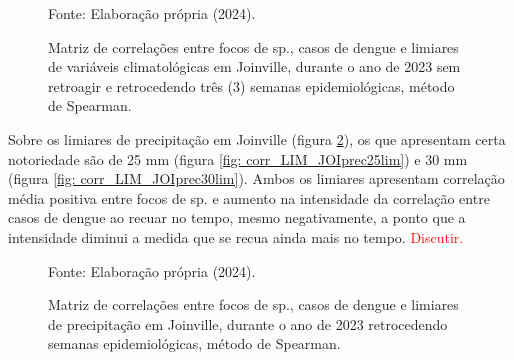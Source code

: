 \documentclass[
	12pt,				%
	openright,			%
	oneside,			%
	a4paper,			%
	english,			%
	french,				%
	spanish,			%
	brazil				%
	dvipsnames, table]{abntex2}
\begin{document}
\begin{figure}[htbp]
    \begin{center}
    \caption{Matriz de correlações entre focos de  sp., casos de dengue e limiares de variáveis climatológicas em Joinville, durante o ano de 2023 sem retroagir e retrocedendo três (3) semanas epidemiológicas, método de Spearman.}
    \label{fig: matriz_corr_LIM_JOIretro}
        \hfill
    \end{center}
    \small{Fonte: Elaboração própria (2024).}
\end{figure}

\indent Sobre os limiares de precipitação em Joinville (figura \ref{fig: matriz_corr_LIM_JOIprec}), os que apresentam certa notoriedade são de 25 mm (figura \ref{fig: corr_LIM_JOIprec25lim}) e 30 mm (figura \ref{fig: corr_LIM_JOIprec30lim}). Ambos os limiares apresentam correlação média positiva entre focos de  sp. e aumento na intensidade da correlação entre casos de dengue ao recuar no tempo, mesmo negativamente, a ponto que a intensidade diminui a medida que se recua ainda mais no tempo. \textcolor{red}{Discutir.}

\begin{figure}[htbp]
    \begin{center}
    \caption{Matriz de correlações entre focos de  sp., casos de dengue e limiares de precipitação em Joinville, durante o ano de 2023 retrocedendo semanas epidemiológicas, método de Spearman.}
    \label{fig: matriz_corr_LIM_JOIprec}
        \hfill
    \end{center}
    \small{Fonte: Elaboração própria (2024).}
\end{figure}
\end{document}
